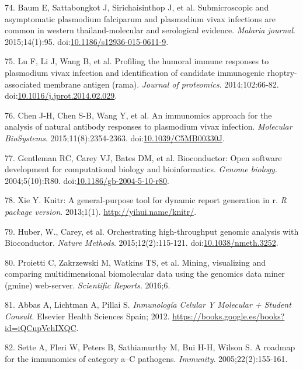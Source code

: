 \documentclass[]{article}
\begin{document}
\hypertarget{ref-baum2015}{}
74. Baum E, Sattabongkot J, Sirichaisinthop J, et al. Submicroscopic and
asymptomatic plasmodium falciparum and plasmodium vivax infections are
common in western thailand-molecular and serological evidence.
\emph{Malaria journal}. 2015;14(1):95.
doi:\href{https://doi.org/10.1186/s12936-015-0611-9}{10.1186/s12936-015-0611-9}.

\hypertarget{ref-lu2014rama}{}
75. Lu F, Li J, Wang B, et al. Profiling the humoral immune responses to
plasmodium vivax infection and identification of candidate immunogenic
rhoptry-associated membrane antigen (rama). \emph{Journal of
proteomics}. 2014;102:66-82.
doi:\href{https://doi.org/10.1016/j.jprot.2014.02.029}{10.1016/j.jprot.2014.02.029}.

\hypertarget{ref-chen2015immunomics}{}
76. Chen J-H, Chen S-B, Wang Y, et al. An immunomics approach for the
analysis of natural antibody responses to plasmodium vivax infection.
\emph{Molecular BioSystems}. 2015;11(8):2354-2363.
doi:\href{https://doi.org/10.1039/C5MB00330J}{10.1039/C5MB00330J}.

\hypertarget{ref-bioconductor2004}{}
77. Gentleman RC, Carey VJ, Bates DM, et al. Bioconductor: Open software
development for computational biology and bioinformatics. \emph{Genome
biology}. 2004;5(10):R80.
doi:\href{https://doi.org/10.1186/gb-2004-5-10-r80}{10.1186/gb-2004-5-10-r80}.

\hypertarget{ref-knitr}{}
78. Xie Y. Knitr: A general-purpose tool for dynamic report generation
in r. \emph{R package version}. 2013;1(1).
\url{http://yihui.name/knitr/}.

\hypertarget{ref-Biobase}{}
79. Huber, W., Carey, et al. Orchestrating high-throughput genomic
analysis with Bioconductor. \emph{Nature Methods}. 2015;12(2):115-121.
doi:\href{https://doi.org/10.1038/nmeth.3252}{10.1038/nmeth.3252}.

\hypertarget{ref-gmine2016}{}
80. Proietti C, Zakrzewski M, Watkins TS, et al. Mining, visualizing and
comparing multidimensional biomolecular data using the genomics data
miner (gmine) web-server. \emph{Scientific Reports}. 2016;6.

\hypertarget{ref-abbas2012}{}
81. Abbas A, Lichtman A, Pillai S. \emph{Inmunología Celular Y Molecular
+ Student Consult}. Elsevier Health Sciences Spain; 2012.
\url{https://books.google.es/books?id=iQCupVehIXQC}.

\hypertarget{ref-sette2005}{}
82. Sette A, Fleri W, Peters B, Sathiamurthy M, Bui H-H, Wilson S. A
roadmap for the immunomics of category a--C pathogens. \emph{Immunity}.
2005;22(2):155-161.
\end{document}
